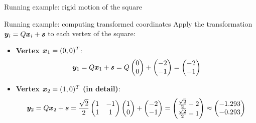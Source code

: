 \documentclass[aspectratio=169]{beamer}\usepackage[]{graphicx}\usepackage[]{xcolor}
\begin{document}
\begin{frame}{Running example: rigid motion of the square}
\end{frame}

\begin{frame}{Running example: computing transformed coordinates}
Apply the transformation $\bm{y}_i = Q\bm{x}_i + \bm{s}$ to each vertex of the square:
\vfill
\begin{itemize}
\item \textbf{Vertex $\bm{x}_1 = (0,0)^T$}:
\[
\bm{y}_1 = Q\bm{x}_1 + \bm{s} = Q\begin{pmatrix} 0 \\ 0 \end{pmatrix} + \begin{pmatrix} -2 \\ -1 \end{pmatrix} = \begin{pmatrix} -2 \\ -1 \end{pmatrix}
\]
\vfill
\item \textbf{Vertex $\bm{x}_2 = (1,0)^T$ (in detail)}:
\[
\bm{y}_2 = Q\bm{x}_2 + \bm{s} = \frac{\sqrt{2}}{2}\begin{pmatrix} 1 & -1 \\ 1 & 1 \end{pmatrix}\begin{pmatrix} 1 \\ 0 \end{pmatrix} + \begin{pmatrix} -2 \\ -1 \end{pmatrix}
= \begin{pmatrix} \frac{\sqrt{2}}{2}-2 \\ \frac{\sqrt{2}}{2}-1 \end{pmatrix} \approx \begin{pmatrix} -1.293 \\ -0.293 \end{pmatrix}
\]
\end{itemize}
\end{frame}
\end{document}
